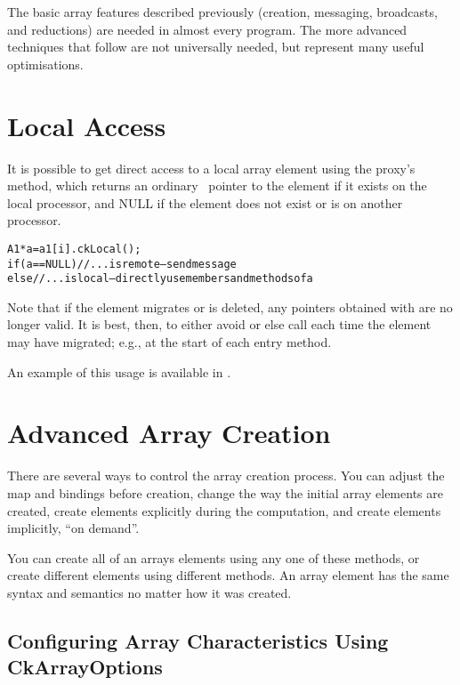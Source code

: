 The basic array features described previously (creation, messaging,
broadcasts, and reductions) are needed in almost every
\charmpp{} program.  The more advanced techniques that follow
are not universally needed, but represent many useful optimisations.

\section{Local Access}

\label{ckLocal for arrays}
It is possible to get direct access to a local array element using the
proxy's  method, which returns an ordinary \CC\ pointer
to the element if it exists on the local processor, and NULL if
the element does not exist or is on another processor.

\begin{alltt}
A1 *a=a1[i].ckLocal();
if (a==NULL) //...is remote-- send message
else //...is local-- directly use members and methods of a
\end{alltt}

Note that if the element migrates or is deleted, any pointers 
obtained with  are no longer valid.  It is best,
then, to either avoid  or else call  
each time the element may have migrated; e.g., at the start 
of each entry method.

An example of this usage is available
in .

\section{Advanced Array Creation}
\label{advanced array create}

There are several ways to control the array creation process.
You can adjust the map and bindings before creation, change
the way the initial array elements are created, create elements
explicitly during the computation, and create elements implicitly,
``on demand''.  

You can create all of an arrays elements using any one of these methods,
or create different elements using different methods.  
An array element has the same syntax and semantics no matter
how it was created.  



\subsection{Configuring Array Characteristics Using CkArrayOptions}
\label{CkArrayOptions}

